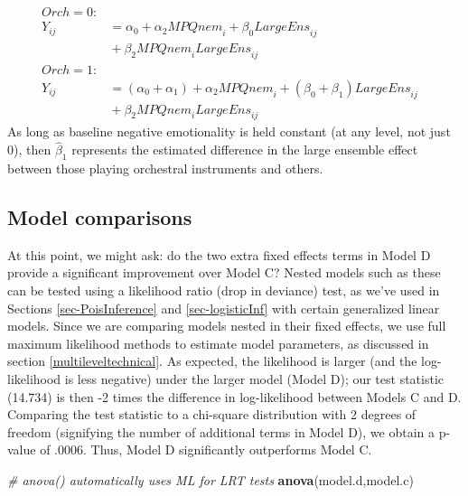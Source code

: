 \documentclass[
]{krantz}
\newenvironment{Shaded}{\begin{snugshade}}{\end{snugshade}}
\newcommand{\CommentTok}[1]{\textcolor[rgb]{0.37,0.37,0.37}{\textit{#1}}}
\newcommand{\KeywordTok}[1]{\textcolor[rgb]{0.27,0.27,0.27}{\textbf{#1}}}
\newcommand{\NormalTok}[1]{#1}
\begin{document}
\begin{itemize}
  \begin{align*}
  \textstyle{Orch}=0: & & \\
  Y_{ij} & = \alpha_{0}+\alpha_{2}\textstyle{MPQnem}_{i}+\beta_{0}\textstyle{LargeEns}_{ij} \\
   & \textrm{} +\beta_{2}\textstyle{MPQnem}_{i}\textstyle{LargeEns}_{ij} \\
  \textstyle{Orch}=1: & \\
  Y_{ij} & = (\alpha_{0}+\alpha_{1})+\alpha_{2}\textstyle{MPQnem}_{i}+(\beta_{0}+\beta_{1})\textstyle{LargeEns}_{ij} \\
   & \textrm{} +\beta_{2}\textstyle{MPQnem}_{i}\textstyle{LargeEns}_{ij}
  \end{align*}
  As long as baseline negative emotionality is held constant (at any level, not just 0), then \(\hat{\beta}_{1}\) represents the estimated difference in the large ensemble effect between those playing orchestral instruments and others.
\end{itemize}

\hypertarget{compare:modeld}{%
\subsection{Model comparisons}\label{compare:modeld}}

At this point, we might ask: do the two extra fixed effects terms in Model D provide a significant improvement over Model C? Nested models such as these can be tested using a likelihood ratio (drop in deviance) test, as we've used in Sections \ref{sec-PoisInference} and \ref{sec-logisticInf} with certain generalized linear models. Since we are comparing models nested in their fixed effects, we use full maximum likelihood methods to estimate model parameters, as discussed in section \ref{multileveltechnical}. As expected, the likelihood is larger (and the log-likelihood is less negative) under the larger model (Model D); our test statistic (14.734) is then -2 times the difference in log-likelihood between Models C and D. Comparing the test statistic to a chi-square distribution with 2 degrees of freedom (signifying the number of additional terms in Model D), we obtain a p-value of .0006. Thus, Model D significantly outperforms Model C.

\begin{Shaded}
\begin{Highlighting}[]
\CommentTok{# anova() automatically uses ML for LRT tests}
\KeywordTok{anova}\NormalTok{(model.d,model.c)}
\end{Highlighting}
\end{Shaded}
\end{document}
